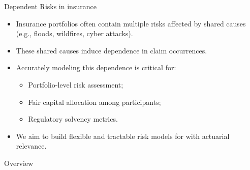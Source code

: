 \documentclass[11pt,xcolor={dvipsnames},hyperref={pdftex,pdfpagemode=UseNone,hidelinks,pdfdisplaydoctitle=true},usepdftitle=false]{beamer}
\begin{document}
\begin{frame}{Dependent Risks in insurance}
\begin{itemize}
    \item Insurance portfolios often contain multiple risks affected by shared causes (e.g., floods, wildfires, cyber attacks).
    
    \item These shared causes induce dependence in claim occurrences.
    
    \item Accurately modeling this dependence is critical for:
    \begin{itemize}
        \item Portfolio-level risk assessment;
        \item Fair capital allocation among participants;
        \item Regulatory solvency metrics.
    \end{itemize}
    
    \item We aim to build flexible and tractable risk models for  with actuarial relevance.
\end{itemize}
\end{frame}

\begin{frame}[label=toc]{Overview}
    \setlength{\leftskip}{5cm}%
    \tableofcontents[subsectionstyle=hide]
\end{frame}
\end{document}
